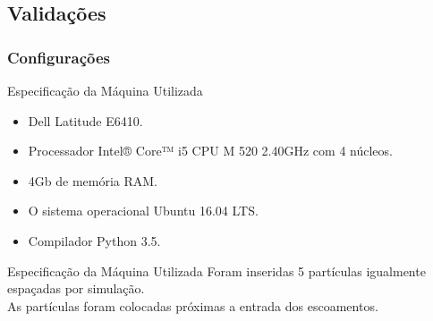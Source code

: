 \documentclass{beamer}
\begin{document}
\subsection{Validações}
\begin{frame}
  \frametitle{Configurações}
  
  \begin{block}{Especificação da Máquina Utilizada}
    \begin{itemize}
      \item Dell Latitude E6410.
      \item Processador Intel® Core™ i5 CPU M 520 2.40GHz com 4 núcleos.
      \item 4Gb de memória RAM.
      \item O sistema operacional Ubuntu 16.04 LTS.
      \item Compilador Python 3.5.
    \end{itemize}
  \end{block}
  
  \begin{block}{Especificação da Máquina Utilizada}
    Foram inseridas 5 partículas igualmente espaçadas por simulação.\\
    As partículas foram colocadas próximas a entrada dos escoamentos.
  \end{block}
\end{frame}
\end{document}
